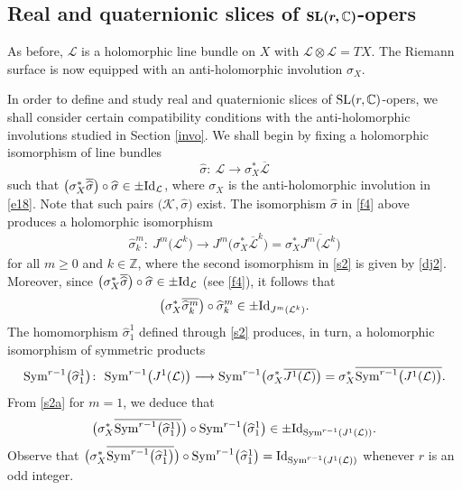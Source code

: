 \documentclass[pdftex]{sigma}
\numberwithin{equation}{section}
\begin{document}
\subsection[Real and quaternionic slices of SL(r,C)-opers]{Real and quaternionic slices of $\boldsymbol{{\rm SL}(r,\mathbb{C})}$-opers}

As before, $\mathcal L$ is a holomorphic line bundle on $X$ with ${\mathcal L}\otimes {\mathcal L} = TX$.
The Riemann surface is now equipped with an anti-holomorphic involution $\sigma_X$.

In order to define and study real and quaternionic slices of ${\rm SL}(r,\mathbb{C})$-opers, we shall consider certain
compatibility conditions with the anti-holomorphic involutions studied in Section \ref{invo}.
We shall begin by fixing a holomorphic isomorphism of line bundles
\begin{equation}\label{f4}
\widehat{\sigma}\colon\ {\mathcal L} \longrightarrow \sigma^*_X \overline{\mathcal L}
\end{equation}
such that $\bigl(\sigma^*_X \overline{\widehat{\sigma}}\bigr)\circ\widehat{\sigma} \in \pm {\rm Id}_{\mathcal L}$,
where $\sigma_X$ is the anti-holomorphic involution in \eqref{e18}. Note that such pairs $\bigl({\mathcal K}, \widehat{\sigma}\bigr)$
exist. The isomorphism $\widehat{\sigma}$ in \eqref{f4} above produces a holomorphic isomorphism%
\begin{gather}\label{s2}
\widehat{\sigma}^m_k\colon\ J^m\bigl({\mathcal L}^k\bigr) \longrightarrow
J^m\bigl(\sigma^*_X \overline{\mathcal L}^k\bigr)
 = \sigma^*_X \overline{J^m\bigl({\mathcal L}^k\bigr)}
\end{gather}
for all $m \geq 0$ and $k \in \mathbb Z$, where the second isomorphism in \eqref{s2} is given by
\eqref{dj2}. Moreover, since $\bigl(\sigma^*_X \overline{\widehat{\sigma}}\bigr)
\circ\widehat{\sigma} \in \pm {\rm Id}_{\mathcal L}$ (see \eqref{f4}), it follows that
\begin{equation}\label{s2a}
\bigl(\sigma^*_X \overline{\widehat{\sigma}^m_k}\bigr)\circ\widehat{\sigma}^m_k \in \pm {\rm Id}_{J^m({\mathcal L}^k)}.
\end{equation}
The homomorphism $\widehat{\sigma}^1_1$ defined through \eqref{s2} produces, in turn, a
holomorphic isomorphism of symmetric products
\begin{equation}\label{f5}
{\rm Sym}^{r-1}\bigl(\widehat{\sigma}^1_1\bigr)\colon\ {\rm Sym}^{r-1}\bigl(J^1(\mathcal L)\bigr)
\longrightarrow {\rm Sym}^{r-1}\bigl(\sigma^*_X
\overline{J^1(\mathcal L)}\bigr) = \sigma^*_X\overline{{\rm Sym}^{r-1}\bigl(J^1({\mathcal L})\bigr)}.
\end{equation}
{}From \eqref{s2a} for $m = 1$, we deduce that
\[
\bigl(\sigma^*_X \overline{{\rm Sym}^{r-1}\bigl(\widehat{\sigma}^1_1\bigr)}\bigr)\circ{\rm Sym}^{r-1}\bigl(\widehat{\sigma}^1_1\bigr) \in
\pm {\rm Id}_{{\rm Sym}^{r-1}(J^1(\mathcal L))}.
\]
Observe that $\bigl(\sigma^*_X \overline{{\rm Sym}^{r-1}\bigl(\widehat{\sigma}^1_1\bigr)}\bigr)\circ
{\rm Sym}^{r-1}\bigl(\widehat{\sigma}^1_1\bigr) =
{\rm Id}_{{\rm Sym}^{r-1}(J^1(\mathcal L))}$ whenever $r$ is an odd integer.
\end{document}
